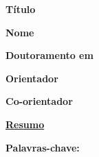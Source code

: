 \documentclass[10pt,a4paper]{report}
\begin{document}
	
\textbf{Título} 

\textbf{Nome} 

\textbf{Doutoramento em} 

\textbf{Orientador} 

\textbf{Co-orientador} 

\vspace{1.5cm}

\underline{\textbf{Resumo}}

\vspace{0.3cm}


\vfill

\textbf{Palavras-chave:} 
\end{document}

